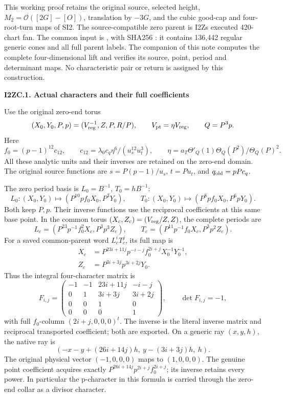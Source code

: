 This working proof retains the original source, selected height,
\(M_2=\mathcal O([2G]-[O])\), translation by \(-3G\), and
the cubic good-cap and four-root-turn maps of SI2. The source-compatible
zero parent is I2Z\textquotesingle s executed 420-chart fan. The common input is
, with SHA256
:
it contains 136,442 regular generic cones and all full parent labels.
The companion of this note computes the complete four-dimensional
lift and verifies its source, point, period and determinant maps.
No characteristic pair or return is assigned by this construction.

\par

\medskip\noindent\textbf{I2ZC.1. Actual characters and their full coefficients}

\par\nobreak

Use the original zero-end torus
\[
 (X_0,Y_0,P,p)=(V_{\rm reg}^{-1},Z,P,R/P),\qquad
 V_{\rm pt}=\eta V_{\rm reg},\qquad Q=P^3p.
\]
Here
\[
 f_0=(p-1)^{12}c_{12},\qquad
 c_{12}=\lambda_0c_q\eta^6/(u_s^{12}u_t^3),\qquad
 \eta=a_T\Theta'_Q(1)\Theta_Q(P^2)/\Theta_Q(P)^2.
\]
All these analytic units and their inverses are retained on the
zero-end domain. The original source functions are
\(s=P(p-1)/u_s\), \(t=Pu_t\), and \(q_{\rm old}=pPc_q\).

The zero period basis is \(L_0=B^{-1}\), \(T_0=hB^{-1}\):
\[
 L_0:(X_0,Y_0)\mapsto(P^{10}p f_0X_0,P^3Y_0),\qquad
 T_0:(X_0,Y_0)\mapsto(P^8p f_0X_0,P^6pY_0).
 \tag{I2ZC.1}
\]
Both keep \(P,p\). Their inverse functions use the reciprocal
coefficients at this same base point. In the common torus
\((X_c,Z_c)=(V_{\rm reg}/Z,Z)\), the complete periods are
\[
 L_c=(P^{23}p^{-1}f_0^2X_c,P^3p^3Z_c),\qquad
 T_c=(P^{11}p^{-1}f_0X_c,P^3p^2Z_c).
\]
For a saved common-parent word \(L_c^iT_c^j\), its full map is
\[
 \begin{aligned}
 X_c&=P^{23i+11j}p^{-i-j}f_0^{2i+j}X_0^{-1}Y_0^{-1},\\
 Z_c&=P^{3i+3j}p^{3i+2j}Y_0.
 \end{aligned} \tag{I2ZC.2}
\]
Thus the integral four-character matrix is
\[
 F_{i,j}=\begin{pmatrix}
 -1&-1&23i+11j&-i-j\\
 0&1&3i+3j&3i+2j\\
 0&0&1&0\\0&0&0&1
 \end{pmatrix},\qquad\det F_{i,j}=-1,
 \tag{I2ZC.3}
\]
with full \(f_0\)-column \((2i+j,0,0,0)^t\). The inverse is
the literal inverse matrix and reciprocal transported coefficient;
both are exported. On a generic ray \((x,y,h)\), the native ray is
\[
 (-x-y+(26i+14j)h,\ y-(3i+3j)h,\ h).
 \tag{I2ZC.4}
\]
The original physical vector \((-1,0,0,0)\) maps to
\((1,0,0,0)\). The genuine point coefficient acquires exactly
\(P^{26i+14j}p^{2i+j}f_0^{2i+j}\); its inverse retains every
power. In particular the p-character in this formula is carried
through the zero-end collar as a divisor character.


